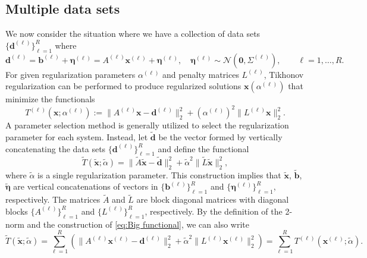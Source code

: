 \documentclass[12pt]{article}
\newcommand{\bVec}{\mathbf{b}}	%
\newcommand{\dVec}{\mathbf{d}}	%
\newcommand{\xVec}{\mathbf{x}}	%
\newcommand{\regparam}{\alpha}  %
\newcommand{\noise}{\eta}	%
\newcommand{\noiseVec}{\bm{\noise}}	%
\begin{document}
\subsection{Multiple data sets} \label{sec:Multiple data sets}
We now consider the situation where we have a collection of data sets $\{\dVec^{(\ell)}\}_{\ell=1}^R$ where 
\begin{equation}
\label{eq:Big vectors}
\dVec^{(\ell)} = \bVec^{(\ell)} + \noiseVec^{(\ell)} = {A^{(\ell)}}\xVec^{(\ell)} + \noiseVec^{(\ell)}, \quad \noiseVec^{(\ell)} \sim \mathcal{N}(\bm{0},\Sigma^{(\ell)}), \qquad \ell = 1,\ldots,R.
\end{equation}
For given regularization parameters $\regparam^{(\ell)}$ and penalty matrices $L^{(\ell)}$, Tikhonov regularization can be performed to produce regularized solutions $\xVec(\regparam^{(\ell)})$ that minimize the functionals
\begin{equation}
T^{(\ell)}(\xVec;\regparam^{(\ell)}) := \|A^{(\ell)}\xVec - \dVec^{(\ell)}\|_2^2 + \left(\regparam^{(\ell)}\right)^2\|L^{(\ell)}\xVec\|_2^2.
\end{equation}
A parameter selection method is generally utilized to select the regularization parameter for each system. Instead, let $\widetilde{\dVec}$ be the vector formed by vertically concatenating the data sets $\{\dVec^{(\ell)}\}_{\ell=1}^R$ and define the functional
\begin{equation}
\label{eq:Big functional}
\widetilde{T}\left(\widetilde{\xVec};\widetilde{\regparam}\right) = \|\widetilde{A}\widetilde{\xVec} - \widetilde{\dVec}\|_2^2 + \widetilde{\regparam}^2\|\widetilde{L}\widetilde{\xVec}\|_2^2,
\end{equation}
where $\widetilde{\regparam}$ is a single regularization parameter. This construction implies that $\widetilde{\xVec}$, $\widetilde{\bVec}$, $\widetilde{\noiseVec}$ are vertical concatenations of vectors in $\{\bVec^{(\ell)}\}_{\ell=1}^R$ and $\{\noiseVec^{(\ell)}\}_{\ell=1}^R$, respectively. The matrices $\widetilde{A}$ and $\widetilde{L}$ are block diagonal matrices with diagonal blocks $\{A^{(\ell)}\}_{\ell=1}^R$ and $\{L^{(\ell)}\}_{\ell=1}^R$, respectively. By the definition of the 2-norm and the construction of \eqref{eq:Big functional}, we can also write
\begin{equation}
\label{eq:Big functional 2}
\widetilde{T}\left(\widetilde{\xVec};\widetilde{\regparam}\right) = \sum_{\ell = 1}^R \left(\|A^{(\ell)}\xVec^{(\ell)} - \dVec^{(\ell)}\|_2^2 + \widetilde{\regparam}^2\|L^{(\ell)} \xVec^{(\ell)}\|_2^2\right) = \sum_{\ell=1}^R T^{(\ell)}\left(\xVec^{(\ell)};\widetilde{\regparam}\right).
\end{equation}
\end{document}

